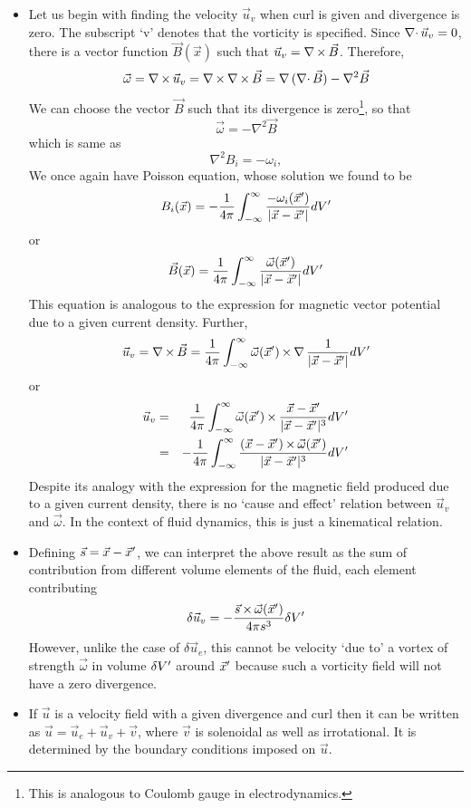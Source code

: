 \begin{itemize}
\item Let us begin with finding the velocity $\vec{u}_v$ when curl is given and divergence is zero. The subscript \enquote*{v} denotes that the vorticity is specified. Since 
$\operatorname{\nabla\cdot}{\vec{u}_v} = 0$, there is a vector function $\vec{B}(\vec{x})$ such that $\vec{u}_v = \operatorname{\nabla\operatorname{\times}}{\vec{B}}$. Therefore, 
\[
\vec{\omega} = \operatorname{\nabla\operatorname{\times}}{\vec{u}_v} = \operatorname{\nabla\operatorname{\times}}{\operatorname{\nabla\operatorname{\times}}{\vec{B}}} = \operatorname{\nabla}{(\operatorname{\nabla\cdot}{\vec{B}})} - \nabla^2\vec{B}
\]
We can choose the vector $\vec{B}$ such that its divergence is zero\footnote{This is analogous to Coulomb gauge in electrodynamics.}, so that
\[
\vec{\omega} = -\nabla^2\vec{B}
\]
which is same as
\[
\nabla^2 B_i = -\omega_i,
\]
We once again have Poisson equation, whose solution we found to be
\[
B_i(\vec{x}) = -\frac{1}{4\pi}\int_{-\infty}^{\infty}\frac{-\omega_i(\vec{x}^\prime)}{|\vec{x}-\vec{x}^\prime|} dV^\prime
\]
or
\[
\vec{B}(\vec{x}) = \frac{1}{4\pi}\int_{-\infty}^{\infty}\frac{\vec{\omega}(\vec{x}^\prime)}{|\vec{x}-\vec{x}^\prime|} dV^\prime
\]
This equation is analogous to the expression for magnetic vector potential due to a given current density. Further,
\[
\vec{u}_v = \operatorname{\nabla\operatorname{\times}}{\vec{B}} = \frac{1}{4\pi}\int_{-\infty}^{\infty}\vec{\omega}(\vec{x}^\prime)\operatorname{\times}\operatorname{\nabla}{\frac{1}{|\vec{x}-\vec{x}^\prime|}} dV^\prime
\]
or
\begin{eqnarray*}
\vec{u}_v &=& \frac{1}{4\pi}\int_{-\infty}^{\infty}\vec{\omega}(\vec{x}^\prime)\operatorname{\times}\frac{\vec{x} - \vec{x}^\prime}{|\vec{x}-\vec{x}^\prime|^3} dV^\prime \\
 &=& -\frac{1}{4\pi}\int_{-\infty}^{\infty} \frac{(\vec{x} - \vec{x}^\prime) \operatorname{\times} \vec{\omega}(\vec{x}^\prime)}{|\vec{x}-\vec{x}^\prime|^3} dV^\prime
\end{eqnarray*}
Despite its analogy with the expression for the magnetic field produced due to a given current density, there is no \enquote*{cause and effect} relation between $\vec{u}_v$ and
$\vec{\omega}$. In the context of fluid dynamics, this is just a kinematical relation.

\item Defining $\vec{s} = \vec{x}-\vec{x}^\prime$, we can interpret the above result as the sum of contribution from different volume elements of the fluid, each element contributing
\[
\delta\vec{u}_v = -\frac{\vec{s} \operatorname{\times} \vec{\omega}(\vec{x}^\prime)}{4\pi s^3}\delta V^\prime
\]
However, unlike the case of $\delta\vec{u}_e$, this cannot be velocity \enquote*{due to} a vortex of strength $\vec{\omega}$ in volume $\delta V^\prime$ around $\vec{x}^\prime$ because such
a vorticity field will not have a zero divergence.

\item If $\vec{u}$ is a velocity field with a given divergence and curl then it can be written as $\vec{u} = \vec{u}_e + \vec{u}_v + \vec{v}$, where $\vec{v}$ is solenoidal as well as
irrotational. It is determined by the boundary conditions imposed on $\vec{u}$.
\end{itemize}

